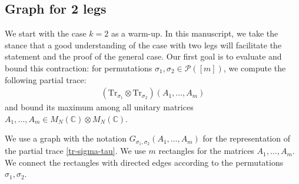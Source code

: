 \documentclass[12pt]{article}
\numberwithin{equation}{section}
\theoremstyle{plain}
\def\bC{\mathbb C}
\def\cP{\mathcal P}
\def\Tr{\mathrm {Tr}}
\begin{document}
\subsection{Graph for 2 legs} \label{sec:graph-2 leg}

We start with the case $k=2$ as a warm-up. In this manuscript, we take the stance that a good understanding of the case with two legs will facilitate the statement and the proof of the general case.
Our first goal is to evaluate and bound this contraction: for permutations $\sigma_1, \sigma_2 \in \cP([m])$, we compute the following partial trace:
\begin{align} \label{tr-sigma-tau}
    \left( \Tr_{\sigma_1} \otimes \Tr_{\sigma_2} \right) \left( A_1, \ldots, A_m \right)
\end{align}
and bound its maximum among all unitary matrices $A_1, \ldots, A_m \in M_N (\bC) \otimes M_N(\bC)$.

We use a graph with the notation $G_{\sigma_1,\sigma_2} (A_1,\ldots,A_m)$ for the representation of the partial trace \eqref{tr-sigma-tau}. We use $m$ rectangles for the matrices $A_1,\ldots,A_m$. We connect the rectangles with directed edges according to the permutations $\sigma_1, \sigma_2$.
\end{document}
